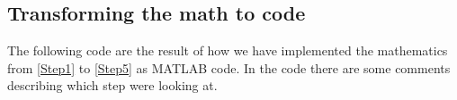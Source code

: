\subsection{Transforming the math to code}
\label{WeDidIt}
The following code are the result of how we have implemented the mathematics from \autoref{Step1} to \autoref{Step5} as MATLAB code. In the code there are some comments describing which step were looking at. 
\newpage

